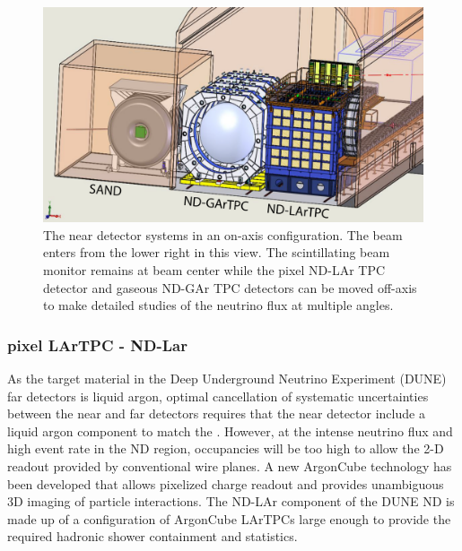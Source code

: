  \begin{figure}[ht]
     \centering
     \includegraphics[height=0.5\textwidth]{graphics/IntroFigures/All3Detectors.pdf}
     \caption{The near detector systems in an on-axis configuration.  The beam enters from the lower right in this view. The  scintillating beam monitor remains at beam center while the pixel ND-LAr TPC detector and gaseous ND-GAr TPC detectors can be moved off-axis to make detailed studies of the neutrino flux at multiple angles.  }
     \label{nd}
 \end{figure}
 
 \subsubsection{pixel LArTPC - ND-Lar}
 
 As the target material in the Deep Underground Neutrino Experiment (DUNE) far detectors is liquid argon, optimal cancellation of systematic uncertainties between the near and far detectors requires that the near detector include a liquid argon component to match the .  However, at the intense neutrino flux and high event rate in the ND region, occupancies will be too high to allow the 2-D readout provided by conventional wire planes. A new ArgonCube  technology has been developed that allows pixelized charge readout  and provides unambiguous 3D imaging of  particle interactions.  The ND-LAr component of the DUNE ND is made up of a configuration of ArgonCube LArTPCs  large enough to provide the required hadronic shower containment and statistics.  %
 
